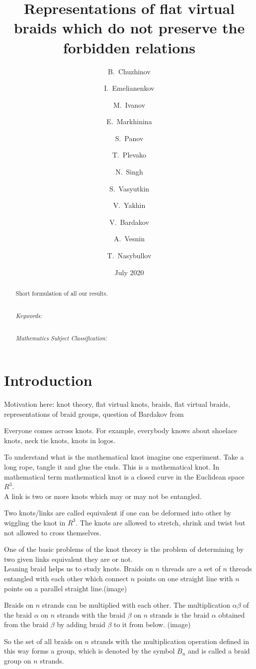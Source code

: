 \documentclass{article}
\title{Representations of flat virtual braids which do not preserve the forbidden relations}
\author{B.~Chuzhinov \and I.~Emelianenkov \and  M.~Ivanov \and E.~Markhinina  \and S.~Panov \and  T.~Plevako \and N.~Singh \and S.~Vasyutkin \and V.~Yakhin \and V.~Bardakov \and A.~Vesnin \and T.~Nasybullov}
\date{July 2020}
\begin{document}
\maketitle
\begin{abstract}
 Short formulation of all our results.
 
 
 ~\\
 \textit{Keywords:}
 
 ~\\
 \textit{Mathematics Subject Classification:} 
\end{abstract}

\section{Introduction}
Motivation here: knot theory, flat virtual knots, braids, flat virtual braids, representations of braid groups, question of Bardakov from \cite{problems}

Everyone comes across knots. For example, everybody knows about shoelace knots, neck tie knots, knots in logos. 

To understand what is the mathematical knot imagine one experiment. Take a long rope, tangle it and glue the ends. This is a mathematical knot. In mathematical term mathematical knot is  a closed curve in the Euclidean space $R^3$. \\

A link is two or more knots which may or may not be entangled.

Two knots/links are called equivalent if one can be deformed into other by wiggling the knot in $R^3$. The knots are allowed to stretch, shrink and twist but not allowed to cross themselves.

One of the basic problems of the knot theory is the problem of determining by two given links equivalent they are or not.\\

Leaning braid helps us to study knots. Braids on $n$ threads are a set of  $n$ threads entangled with each other which connect $n$ points on one straight line with $n$ points on a parallel straight line.(image)

Braids on $n$ strands can be multiplied with each other. The multiplication $\alpha\beta$ of the braid $\alpha$ on $n$ strands with the braid $\beta$ on $n$ strands is the braid $\alpha$ obtained from the braid $\beta$  by adding braid $\beta$ to it from below. (image)

So the set of all braids on $n$ strands with the multiplication operation defined in this way forms a group, which is denoted by the symbol $B_n$ and is called a braid group on $n$ strands.
\end{document}
